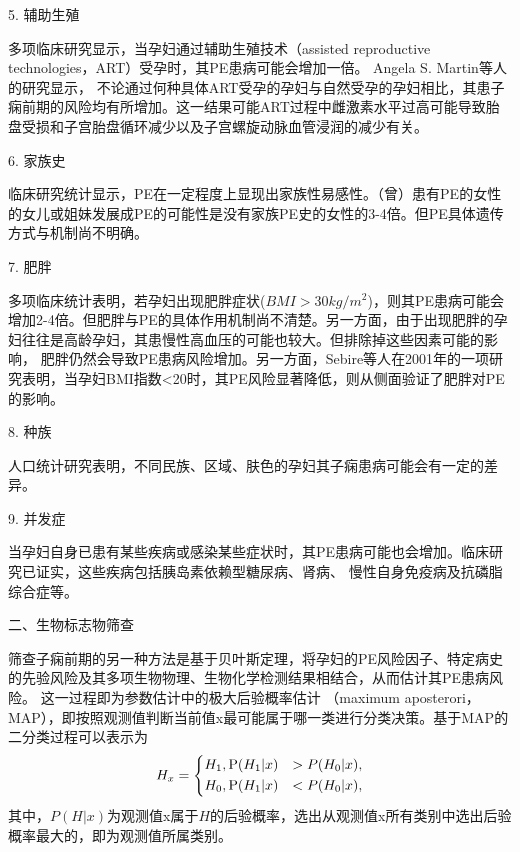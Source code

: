 5. 辅助生殖

多项临床研究显示，当孕妇通过辅助生殖技术（assisted reproductive technologies，ART）受孕时，其PE患病可能会增加一倍\cite{Jackson2004,Trogstad2009}。 Angela S. Martin等人\cite{Martin2016}的研究显示，
不论通过何种具体ART受孕的孕妇与自然受孕的孕妇相比，其患子痫前期的风险均有所增加。这一结果可能ART过程中雌激素水平过高可能导致胎盘受损和子宫胎盘循环减少以及子宫螺旋动脉血管浸润的减少有关。

6. 家族史

临床研究统计显示，PE在一定程度上显现出家族性易感性\cite{ARNGRIMSSON1990,OAG9,Williams2011}。（曾）患有PE的女性的女儿或姐妹发展成PE的可能性是没有家族PE史的女性的3-4倍\cite{ARNGRIMSSON1990,Cincotta1998,FIGO,Williams2011}。但PE具体遗传方式与机制尚不明确。

7. 肥胖

多项临床统计表明，若孕妇出现肥胖症状($BMI>30kg/m^2$)，则其PE患病可能会增加2-4倍\cite{Williams2011,FIGO,Zintzaras2006}。但肥胖与PE的具体作用机制尚不清楚。另一方面，由于出现肥胖的孕妇往往是高龄孕妇，其患慢性高血压的可能也较大。但排除掉这些因素可能的影响，
肥胖仍然会导致PE患病风险增加\cite{Duckitt2005}。另一方面，Sebire等人\cite{Sebire2001}在2001年的一项研究表明，当孕妇BMI指数<20时，其PE风险显著降低，则从侧面验证了肥胖对PE的影响。

8. 种族

人口统计研究表明，不同民族、区域、肤色的孕妇其子痫患病可能会有一定的差异\cite{Ghosh2014,Khalil2013}。

9. 并发症

当孕妇自身已患有某些疾病或感染某些症状时，其PE患病可能也会增加\cite{FIGO,Ray2016,OAG9}。临床研究已证实，这些疾病包括胰岛素依赖型糖尿病\cite{Lee2000,Garner1990}、肾病\cite{Martinell1990}、
慢性自身免疫病\cite{Stamilio2000}及抗磷脂综合症\cite{Dreyfus2001,Marchetti2016}等。

二、生物标志物筛查

筛查子痫前期的另一种方法是基于贝叶斯定理，将孕妇的PE风险因子、特定病史的先验风险及其多项生物物理、生物化学检测结果相结合，从而估计其PE患病风险\cite{FIGO}。
这一过程即为参数估计中的极大后验概率估计
（maximum aposterori，MAP），即按照观测值判断当前值x最可能属于哪一类进行分类决策\cite{Qiu2012}。基于MAP的二分类过程可以表示为
\begin{equation}
    \label{equ:maxap}
    H_{x}=
    \left \{
    \begin{aligned}
        &H_{1}, \text P(H_{1}|x)&>P(H_{0}|x), \\
        &H_{0}, \text P(H_{1}|x)&<P(H_{0}|x),
    \end{aligned}
    \right.  
\end{equation}
其中，$P(H|x)$为观测值x属于$H$的后验概率，选出从观测值x所有类别中选出后验概率最大的，即为观测值所属类别。

